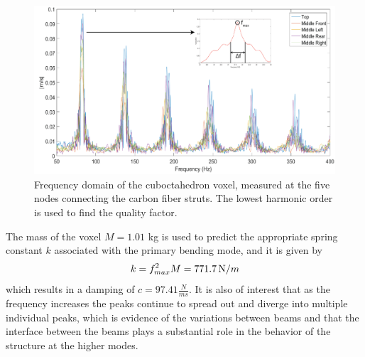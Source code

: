 \documentclass[11pt]{ucthesis}
\begin{document}
\begin{figure}[thpb]
\centering
\includegraphics[width=0.75\linewidth]{Figures/FFTandQ.png}
\caption{Frequency domain of the cuboctahedron voxel, measured at the five nodes connecting the carbon fiber struts. The lowest harmonic order is used to find the quality factor.}
\label{fig:FFTandQ}
\end{figure}
The mass of the voxel $M=1.01$ kg is used to predict the appropriate spring constant $k$ associated with the primary bending mode, and it is given by
\begin{equation}
k = f_{max}^2 M = 771.7 \, {\mbox N/m}
\label{eqn:kfm}
\end{equation}
which results in a damping of $c = 97.41 \frac{N}{ms}$. It is also of interest that as the frequency increases the peaks continue to spread out and diverge into multiple individual peaks, which is evidence of the variations between beams and that the interface between the beams plays a substantial role in the behavior of the structure at the higher modes.
\end{document}
